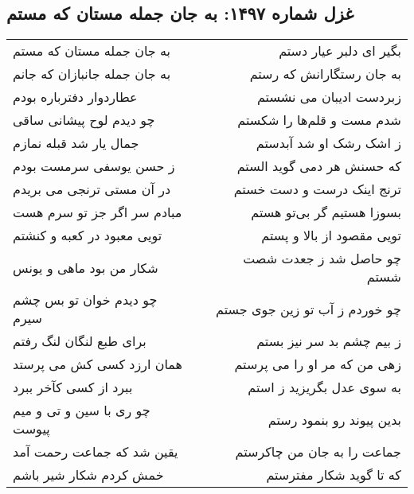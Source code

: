\begin{center}
\section*{غزل شماره ۱۴۹۷: به جان جمله مستان که مستم}
\label{sec:1497}
\begin{longtable}{l p{0.5cm} r}
به جان جمله مستان که مستم
&&
بگیر ای دلبر عیار دستم
\\
به جان جمله جانبازان که جانم
&&
به جان رستگارانش که رستم
\\
عطاردوار دفترباره بودم
&&
زبردست ادیبان می نشستم
\\
چو دیدم لوح پیشانی ساقی
&&
شدم مست و قلم‌ها را شکستم
\\
جمال یار شد قبله نمازم
&&
ز اشک رشک او شد آبدستم
\\
ز حسن یوسفی سرمست بودم
&&
که حسنش هر دمی گوید الستم
\\
در آن مستی ترنجی می بریدم
&&
ترنج اینک درست و دست خستم
\\
مبادم سر اگر جز تو سرم هست
&&
بسوزا هستیم گر بی‌تو هستم
\\
تویی معبود در کعبه و کنشتم
&&
تویی مقصود از بالا و پستم
\\
شکار من بود ماهی و یونس
&&
چو حاصل شد ز جعدت شصت شستم
\\
چو دیدم خوان تو بس چشم سیرم
&&
چو خوردم ز آب تو زین جوی جستم
\\
برای طبع لنگان لنگ رفتم
&&
ز بیم چشم بد سر نیز بستم
\\
همان ارزد کسی کش می پرستد
&&
زهی من که مر او را می پرستم
\\
ببرد از کسی کآخر ببرد
&&
به سوی عدل بگریزید ز استم
\\
چو ری با سین و تی و میم پیوست
&&
بدین پیوند رو بنمود رستم
\\
یقین شد که جماعت رحمت آمد
&&
جماعت را به جان من چاکرستم
\\
خمش کردم شکار شیر باشم
&&
که تا گوید شکار مفترستم
\\
\end{longtable}
\end{center}
